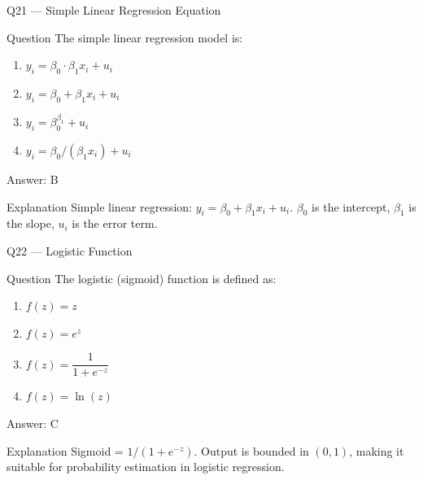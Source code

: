 \documentclass[aspectratio=169,8pt]{beamer}
\begin{document}
	\begin{frame}{Q21 --- Simple Linear Regression Equation}
		\begin{block}{Question}
			The simple linear regression model is:
			\begin{enumerate}
				\item $y_i = \beta_0 \cdot \beta_1 x_i + u_i$
				\item $y_i = \beta_0 + \beta_1 x_i + u_i$
				\item $y_i = \beta_0^{\beta_1} + u_i$
				\item $y_i = \beta_0 / (\beta_1 x_i) + u_i$
			\end{enumerate}
		\end{block}
		\begin{exampleblock}{Answer: B}\end{exampleblock}
		\begin{block}{Explanation}
			Simple linear regression: $y_i = \beta_0 + \beta_1 x_i + u_i$. $\beta_0$ is the intercept, $\beta_1$ is the slope, $u_i$ is the error term.
		\end{block}
	\end{frame}
	
	\begin{frame}{Q22 --- Logistic Function}
		\begin{block}{Question}
			The logistic (sigmoid) function is defined as:
			\begin{enumerate}
				\item $f(z) = z$
				\item $f(z) = e^z$
				\item $f(z) = \dfrac{1}{1 + e^{-z}}$
				\item $f(z) = \ln(z)$
			\end{enumerate}
		\end{block}
		\begin{exampleblock}{Answer: C}\end{exampleblock}
		\begin{block}{Explanation}
			Sigmoid = $1/(1+e^{-z})$. Output is bounded in $(0, 1)$, making it suitable for probability estimation in logistic regression.
		\end{block}
	\end{frame}
	
\end{document}
